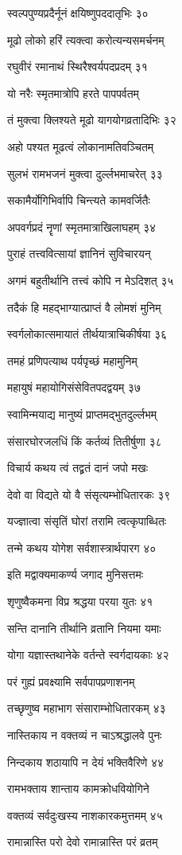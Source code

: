 स्वल्पपुण्यप्रदैर्नूनं क्षयिष्णुपददातृभिः ३०

मूढो लोको हरिं त्यक्त्वा करोत्यन्यसमर्चनम्

रघुवीरं रमानाथं स्थिरैश्वर्यपदप्रदम् ३१

यो नरैः स्मृतमात्रोपि हरते पापपर्वतम्

तं मुक्त्वा क्लिश्यते मूढो यागयोगव्रतादिभिः ३२

अहो पश्यत मूढत्वं लोकानामतिवञ्चितम्

सुलभं रामभजनं मुक्त्वा दुर्ल्लभमाचरेत् ३३

सकामैर्योगिभिर्वापि चिन्त्यते कामवर्जितैः

अपवर्गप्रदं नॄणां स्मृतमात्राखिलाघहम् ३४

पुराहं तत्त्ववित्सायां ज्ञानिनं सुविचारयन्

अगमं बहुतीर्थानि तत्त्वं कोपि न मेऽदिशत् ३५

तदैकं हि महद्भाग्यात्प्राप्तं वै लोमशं मुनिम्

स्वर्गलोकात्समायातं तीर्थयात्राचिकीर्षया ३६

तमहं प्रणिपत्याथ पर्यपृच्छं महामुनिम्

महायुषं महायोगिसंसेवितपदद्वयम् ३७

स्वामिन्मयाद्य मानुष्यं प्राप्तमद्भुतदुर्ल्लभम्

संसारघोरजलधिं किं कर्तव्यं तितीर्षुणा ३८

विचार्य कथय त्वं तद्व्रतं दानं जपो मखः

देवो वा विद्यते यो वै संसृत्यम्भोधितारकः ३९

यज्ज्ञात्वा संसृतिं घोरां तरामि त्वत्कृपाब्धितः

तन्मे कथय योगेश सर्वशास्त्रार्थपारग ४०

इति मद्वाक्यमाकर्ण्य जगाद मुनिसत्तमः

शृणुष्वैकमना विप्र श्रद्धया परया युतः ४१

सन्ति दानानि तीर्थानि व्रतानि नियमा यमाः

योगा यज्ञास्तथानेके वर्तन्ते स्वर्गदायकाः ४२

परं गुह्यं प्रवक्ष्यामि सर्वपापप्रणाशनम्

तच्छृणुष्व महाभाग संसाराम्भोधितारकम् ४३

नास्तिकाय न वक्तव्यं न चाऽश्रद्धालवे पुनः

निन्दकाय शठायापि न देयं भक्तिवैरिणे ४४

रामभक्ताय शान्ताय कामक्रोधवियोगिने

वक्तव्यं सर्वदुःखस्य नाशकारकमुत्तमम् ४५

रामान्नास्ति परो देवो रामान्नास्ति परं व्रतम्

